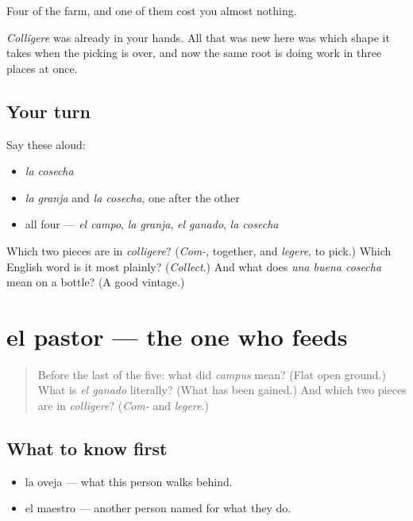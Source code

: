 \begin{grammarlens}[title={What you've built}]
Four of the farm, and one of them cost you almost nothing.

\emph{Colligere} was already in your hands. All that was new here was which shape it takes when the picking is over, and now the same root is doing work in three places at once.
\end{grammarlens}

\subsection*{Your turn}
Say these aloud:

\begin{itemize}
\raggedright
  \item \emph{la cosecha}
  \item \emph{la granja} and \emph{la cosecha}, one after the other
  \item all four — \emph{el campo}, \emph{la granja}, \emph{el ganado}, \emph{la cosecha}
\end{itemize}

\begin{tcolorbox}[breakable,colback=teal!4,colframe=teal!35!black,title={Before you move on}]
Which two pieces are in \emph{colligere}? (\emph{Com-}, together, and \emph{legere}, to pick.) Which English word is it most plainly? (\emph{Collect}.) And what does \emph{una buena cosecha} mean on a bottle? (A good vintage.)
\end{tcolorbox}
\section[el pastor]{el pastor — the one who feeds}

\label{lesson:ES-C299-pastor}



\begin{quote}
Before the last of the five: what did \emph{campus} mean? (Flat open ground.) What is \emph{el ganado} literally? (What has been gained.) And which two pieces are in \emph{colligere}? (\emph{Com-} and \emph{legere}.)
\end{quote}

\subsection*{What to know first}
\begin{itemize}
\raggedright
  \item la oveja — what this person walks behind.
  \item el maestro — another person named for what they do.
\end{itemize}

